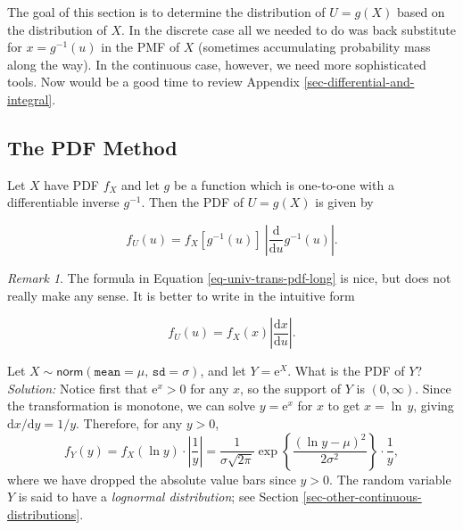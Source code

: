 \documentclass[]{book}
\numberwithin{equation}{chapter}
\numberwithin{figure}{chapter}
\theoremstyle{plain}
\theoremstyle{definition}
\theoremstyle{remark}
\theoremstyle{definition}
\theoremstyle{definition}
\theoremstyle{remark}
\newtheorem*{remark}{Remark}
\let\BeginKnitrBlock\begin \let\EndKnitrBlock\end
\begin{document}
The goal of this section is to determine the distribution of \(U=g(X)\)
based on the distribution of \(X\). In the discrete case all we needed
to do was back substitute for \(x=g^{-1}(u)\) in the PMF of \(X\)
(sometimes accumulating probability mass along the way). In the
continuous case, however, we need more sophisticated tools. Now would be
a good time to review Appendix \ref{sec-differential-and-integral}.

\subsection{The PDF Method}\label{the-pdf-method}

\BeginKnitrBlock{proposition}
\protect\hypertarget{prp:func-cont-rvs-pdf-formula}{}{\label{prp:func-cont-rvs-pdf-formula}}Let
\(X\) have PDF \(f_{X}\) and let \(g\) be a function which is one-to-one
with a differentiable inverse \(g^{-1}\). Then the PDF of \(U=g(X)\) is
given by

\begin{equation}
\label{eq-univ-trans-pdf-long}
f_{U}(u)=f_{X}\left[g^{-1}(u)\right]\ \left|\frac{\mathrm{d}}{\mathrm{d} u}g^{-1}(u)\right|.
\end{equation}
\EndKnitrBlock{proposition}

\bigskip

\begin{remark}
The formula in Equation \eqref{eq-univ-trans-pdf-long} is nice, but does
not really make any sense. It is better to write in the intuitive form

\begin{equation}
\label{eq-univ-trans-pdf-short}
f_{U}(u)=f_{X}(x)\left|\frac{\mathrm{d} x}{\mathrm{d} u}\right|.
\end{equation}
\end{remark}

\bigskip

\BeginKnitrBlock{example}
\protect\hypertarget{ex:lnorm-transformation}{}{\label{ex:lnorm-transformation}}Let
\(X\sim\mathsf{norm}(\mathtt{mean}=\mu,\,\mathtt{sd}=\sigma)\), and let
\(Y=\mathrm{e}^{X}\). What is the PDF of \(Y\)? \emph{Solution:} Notice
first that \(\mathrm{e}^{x}>0\) for any \(x\), so the support of \(Y\)
is \((0,\infty)\). Since the transformation is monotone, we can solve
\(y=\mathrm{e}^{x}\) for \(x\) to get \(x=\ln\, y\), giving
\(\mathrm{d} x/\mathrm{d} y=1/y\). Therefore, for any \(y>0\), \[
f_{Y}(y)=f_{X}(\ln
y)\cdot\left|\frac{1}{y}\right|=\frac{1}{\sigma\sqrt{2\pi}}\exp\left\{
\frac{(\ln y-\mu)^{2}}{2\sigma^{2}}\right\} \cdot\frac{1}{y}, \] where
we have dropped the absolute value bars since \(y>0\). The random
variable \(Y\) is said to have a \emph{lognormal distribution}; see
Section \ref{sec-other-continuous-distributions}.
\EndKnitrBlock{example}
\end{document}
